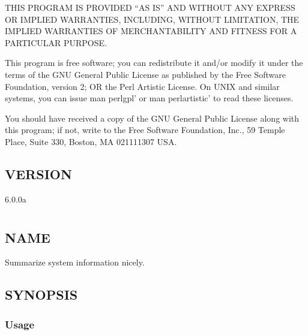\documentclass[letterpaper,10pt,english]{sphinxmanual}
\begin{document}
\sphinxAtStartPar
THIS PROGRAM IS PROVIDED “AS IS” AND WITHOUT ANY EXPRESS OR IMPLIED
WARRANTIES, INCLUDING, WITHOUT LIMITATION, THE IMPLIED WARRANTIES OF
MERCHANTABILITY AND FITNESS FOR A PARTICULAR PURPOSE.

\sphinxAtStartPar
This program is free software; you can redistribute it and/or modify it under
the terms of the GNU General Public License as published by the Free Software
Foundation, version 2; OR the Perl Artistic License.  On UNIX and similar
systems, you can issue \textasciigrave{}man perlgpl’ or \textasciigrave{}man perlartistic’ to read these
licenses.

\sphinxAtStartPar
You should have received a copy of the GNU General Public License along with
this program; if not, write to the Free Software Foundation, Inc., 59 Temple
Place, Suite 330, Boston, MA  02111\sphinxhyphen{}1307  USA.


\section{VERSION}
\label{\detokenize{mariadb-status-diff:version}}
\sphinxAtStartPar
{} 6.0.0a


\chapter{}
\label{\detokenize{mariadb-summary:mariadb-summary}}\label{\detokenize{mariadb-summary::doc}}

\section{NAME}
\label{\detokenize{mariadb-summary:name}}
\sphinxAtStartPar
{} \sphinxhyphen{} Summarize system information nicely.


\section{SYNOPSIS}
\label{\detokenize{mariadb-summary:synopsis}}

\subsection{Usage}
\label{\detokenize{mariadb-summary:usage}}
\begin{sphinxVerbatim}[commandchars=\\\{\}]
\end{sphinxVerbatim}
\end{document}
